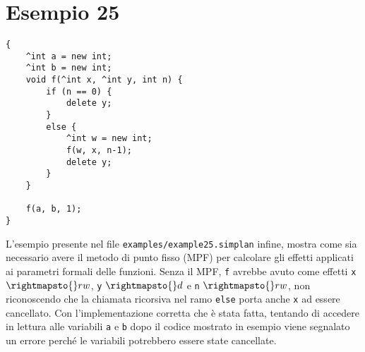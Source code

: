 \documentclass[../report.tex]{subfiles}
\begin{document}
\section{Esempio 25}\label{s:esempio25}
\begin{lstlisting}
{
    ^int a = new int;
    ^int b = new int;
    void f(^int x, ^int y, int n) {
        if (n == 0) {
            delete y;
        }
        else {
            ^int w = new int;
            f(w, x, n-1);
            delete y;
        }
    }

    f(a, b, 1);
}
\end{lstlisting}
L'esempio presente nel file \verb|examples/example25.simplan| infine, mostra come sia necessario avere il metodo di punto fisso (MPF) per calcolare gli effetti applicati ai parametri formali delle funzioni.
Senza il MPF, \verb|f| avrebbe avuto come effetti \verb|x| $\rightmapsto{} rw$, \verb|y| $\rightmapsto{} d$ e \verb|n| $\rightmapsto{} rw$, non riconoscendo che la chiamata ricorsiva nel ramo \verb|else| porta anche \verb|x| ad essere cancellato.
Con l'implementazione corretta che è stata fatta, tentando di accedere in lettura alle variabili \verb|a| e \verb|b| dopo il codice mostrato in esempio viene segnalato un errore perché le variabili potrebbero essere state cancellate.
\end{document}
